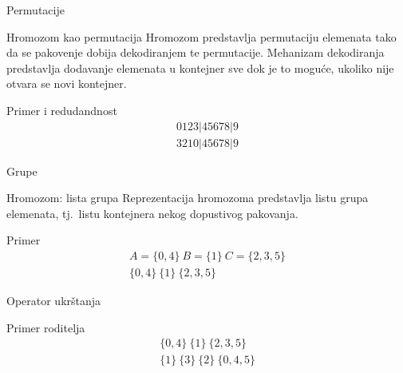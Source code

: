 \documentclass[aspectratio=169,xcolor=dvipsnames]{beamer}
\begin{document}

\begin{frame}{Permutacije}
    \begin{block}{Hromozom kao permutacija}
        Hromozom predstavlja permutaciju elemenata tako da se pakovenje 
        dobija dekodiranjem te permutacije. Mehanizam dekodiranja predstavlja 
        dodavanje elemenata u kontejner sve dok je to moguće, ukoliko nije 
        otvara se novi kontejner.
    \end{block}
    \begin{exampleblock}{Primer i redudandnost}
        \[
            \begin{aligned}
                0123|45678|9 \\
                3210|45678|9
            \end{aligned}
        \]
    \end{exampleblock}
\end{frame}


\begin{frame}{Grupe}
    \begin{block}{Hromozom: lista grupa}
        Reprezentacija hromozoma predstavlja listu grupa elemenata, 
        tj.\ listu kontejnera nekog dopustivog pakovanja.
    \end{block}
    \begin{exampleblock}{Primer}
        \[
            \begin{aligned}
                A=\{0, 4\}\ B=\{1\}\ C=\{2, 3, 5\} \\
                \{0, 4\}\ \{1\}\ \{2, 3, 5\}
            \end{aligned}
        \]
    \end{exampleblock}
\end{frame}


\begin{frame}{Operator ukrštanja}
    \begin{exampleblock}{Primer roditelja}
        \[
            \begin{aligned}
                \{0, 4\}\ \{1\}\ \{2, 3, 5\} \\
                \{1\}\ \{3\}\ \{2\}\ \{0, 4, 5\}
            \end{aligned}
        \]
    \end{exampleblock}
\end{frame}
\end{document}
